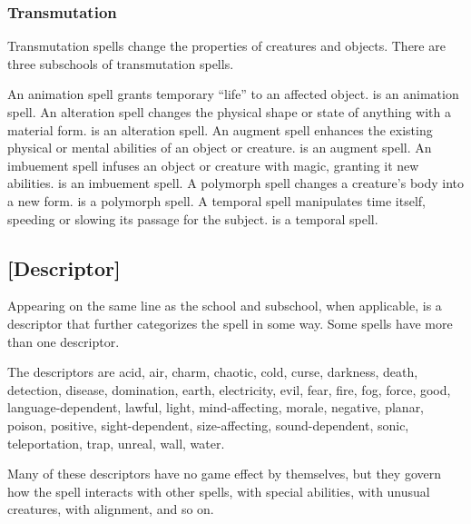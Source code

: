 \subsubsection{Transmutation}
Transmutation spells change the properties of creatures and objects. There are three subschools of transmutation spells.

 An animation spell grants temporary ``life'' to an affected object.  is an animation spell.
 An alteration spell changes the physical shape or state of anything with a material form.  is an alteration spell.
 An augment spell enhances the existing physical or mental abilities of an object or creature.  is an augment spell.
 An imbuement spell infuses an object or creature with magic, granting it new abilities.  is an imbuement spell.
 A polymorph spell changes a creature's body into a new form.  is a polymorph spell.
 A temporal spell manipulates time itself, speeding or slowing its passage for the subject.  is a temporal spell.

\subsection{[Descriptor]}
Appearing on the same line as the school and subschool, when applicable, is a descriptor that further categorizes the spell in some way. Some spells have more than one descriptor.

The descriptors are acid, air, charm, chaotic, cold, curse, darkness, death, detection, disease, domination, earth, electricity, evil, fear, fire, fog, force, good, language-dependent, lawful, light, mind-affecting, morale, negative, planar, poison, positive, sight-dependent, size-affecting, sound-dependent, sonic, teleportation, trap, unreal, wall, water.

Many of these descriptors have no game effect by themselves, but they govern how the spell interacts with other spells, with special abilities, with unusual creatures, with alignment, and so on.

